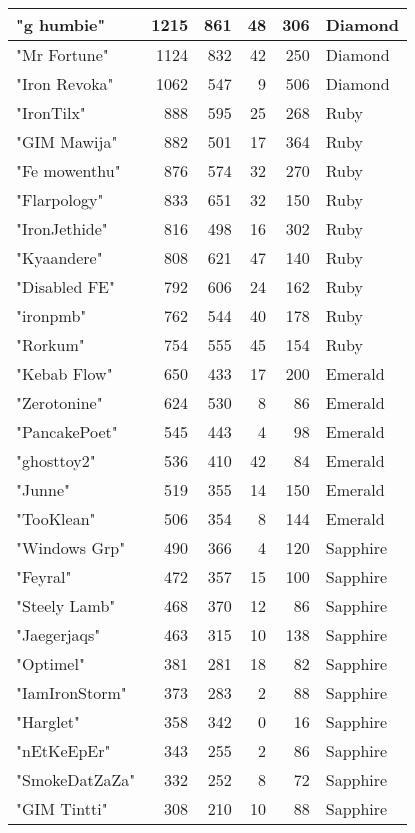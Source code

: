 \documentclass{article}
\begin{document}
\begin{table}[htbp]
\begin{tabular}{|l|r|r|r|r|l|}
"g humbie" & 1215 & 861 & 48 & 306 & Diamond \\ \hline
"Mr Fortune" & 1124 & 832 & 42 & 250 & Diamond \\ \hline
"Iron Revoka" & 1062 & 547 & 9 & 506 & Diamond \\ \hline
"IronTilx" & 888 & 595 & 25 & 268 & Ruby \\ \hline
"GIM Mawija" & 882 & 501 & 17 & 364 & Ruby \\ \hline
"Fe mowenthu" & 876 & 574 & 32 & 270 & Ruby \\ \hline
"Flarpology" & 833 & 651 & 32 & 150 & Ruby \\ \hline
"IronJethide" & 816 & 498 & 16 & 302 & Ruby \\ \hline
"Kyaandere" & 808 & 621 & 47 & 140 & Ruby \\ \hline
"Disabled FE" & 792 & 606 & 24 & 162 & Ruby \\ \hline
"ironpmb" & 762 & 544 & 40 & 178 & Ruby \\ \hline
"Rorkum" & 754 & 555 & 45 & 154 & Ruby \\ \hline
"Kebab Flow" & 650 & 433 & 17 & 200 & Emerald \\ \hline
"Zerotonine" & 624 & 530 & 8 & 86 & Emerald \\ \hline
"PancakePoet" & 545 & 443 & 4 & 98 & Emerald \\ \hline
"ghosttoy2" & 536 & 410 & 42 & 84 & Emerald \\ \hline
"Junne" & 519 & 355 & 14 & 150 & Emerald \\ \hline
"TooKlean" & 506 & 354 & 8 & 144 & Emerald \\ \hline
"Windows Grp" & 490 & 366 & 4 & 120 & Sapphire \\ \hline
"Feyral" & 472 & 357 & 15 & 100 & Sapphire \\ \hline
"Steely Lamb" & 468 & 370 & 12 & 86 & Sapphire \\ \hline
"Jaegerjaqs" & 463 & 315 & 10 & 138 & Sapphire \\ \hline
"Optimel" & 381 & 281 & 18 & 82 & Sapphire \\ \hline
"IamIronStorm" & 373 & 283 & 2 & 88 & Sapphire \\ \hline
"Harglet" & 358 & 342 & 0 & 16 & Sapphire \\ \hline
"nEtKeEpEr" & 343 & 255 & 2 & 86 & Sapphire \\ \hline
"SmokeDatZaZa" & 332 & 252 & 8 & 72 & Sapphire \\ \hline
"GIM Tintti" & 308 & 210 & 10 & 88 & Sapphire \\ \hline

\end{tabular}
\end{table}
\end{document}
